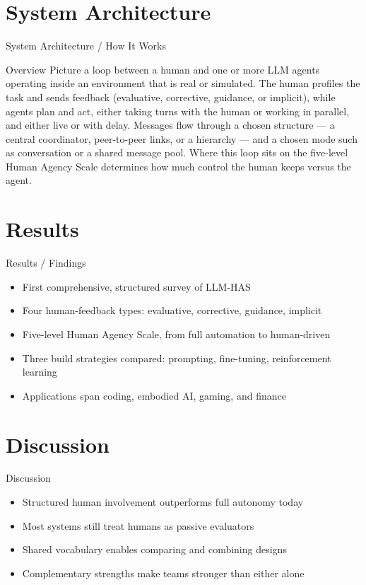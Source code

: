 \documentclass[10pt]{beamer}
\begin{document}
\section{System Architecture}
\begin{frame}{System Architecture / How It Works}
  \begin{block}{Overview}
  Picture a loop between a human and one or more LLM agents operating inside an environment that is real or simulated. The human profiles the task and sends feedback (evaluative, corrective, guidance, or implicit), while agents plan and act, either taking turns with the human or working in parallel, and either live or with delay. Messages flow through a chosen structure — a central coordinator, peer-to-peer links, or a hierarchy — and a chosen mode such as conversation or a shared message pool. Where this loop sits on the five-level Human Agency Scale determines how much control the human keeps versus the agent.
  \end{block}
\end{frame}

\section{Results}
\begin{frame}[allowframebreaks]{Results / Findings}
\begin{itemize}
  \item First comprehensive, structured survey of LLM-HAS
  \item Four human-feedback types: evaluative, corrective, guidance, implicit
  \item Five-level Human Agency Scale, from full automation to human-driven
  \item Three build strategies compared: prompting, fine-tuning, reinforcement learning
  \item Applications span coding, embodied AI, gaming, and finance
\end{itemize}
\end{frame}

\section{Discussion}
\begin{frame}{Discussion}
\begin{itemize}
  \item Structured human involvement outperforms full autonomy today
  \item Most systems still treat humans as passive evaluators
  \item Shared vocabulary enables comparing and combining designs
  \item Complementary strengths make teams stronger than either alone
\end{itemize}
\end{frame}
\end{document}
